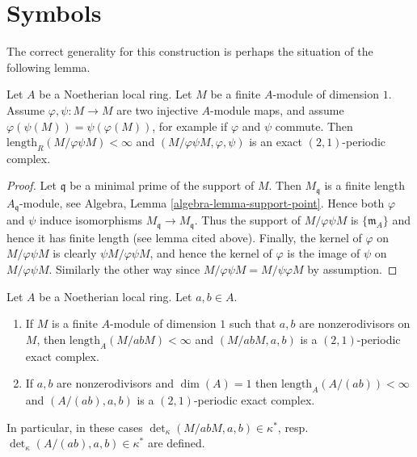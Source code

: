 \section{Symbols}
\label{section-symbols}

\noindent
The correct generality for this construction is perhaps the
situation of the following lemma.

\begin{lemma}
\label{lemma-pre-symbol}
Let $A$ be a Noetherian local ring.
Let $M$ be a finite $A$-module of dimension $1$.
Assume $\varphi, \psi : M \to M$ are two injective
$A$-module maps, and assume $\varphi(\psi(M)) = \psi(\varphi(M))$,
for example if $\varphi$ and $\psi$ commute.
Then $\text{length}_R(M/\varphi\psi M) < \infty$
and $(M/\varphi\psi M, \varphi, \psi)$ is an exact
$(2, 1)$-periodic complex.
\end{lemma}

\begin{proof}
Let $\mathfrak q$ be a minimal prime of the support of $M$.
Then $M_{\mathfrak q}$ is a finite length $A_{\mathfrak q}$-module,
see Algebra, Lemma \ref{algebra-lemma-support-point}.
Hence both $\varphi$ and $\psi$
induce isomorphisms $M_{\mathfrak q} \to M_{\mathfrak q}$.
Thus the support of $M/\varphi\psi M$ is $\{\mathfrak m_A\}$
and hence it has finite length (see lemma cited above).
Finally, the kernel of $\varphi$ on $M/\varphi\psi M$
is clearly $\psi M/\varphi\psi M$, and hence the kernel
of $\varphi$ is the image of $\psi$ on $M/\varphi\psi M$.
Similarly the other way since $M/\varphi\psi M = M/\psi\varphi M$
by assumption.
\end{proof}

\begin{lemma}
\label{lemma-symbol-defined}
Let $A$ be a Noetherian local ring. Let $a, b \in A$.
\begin{enumerate}
\item If $M$ is a finite $A$-module of dimension $1$
such that $a, b$ are nonzerodivisors on $M$, then
$\text{length}_A(M/abM) < \infty$ and
$(M/abM, a, b)$ is a $(2, 1)$-periodic exact complex.
\item If $a, b$ are nonzerodivisors and $\dim(A) = 1$
then $\text{length}_A(A/(ab)) < \infty$ and
$(A/(ab), a, b)$ is a $(2, 1)$-periodic exact complex.
\end{enumerate}
In particular, in these cases
$\det_\kappa(M/abM, a, b) \in \kappa^*$,
resp.\ $\det_\kappa(A/(ab), a, b) \in \kappa^*$
are defined.
\end{lemma}

